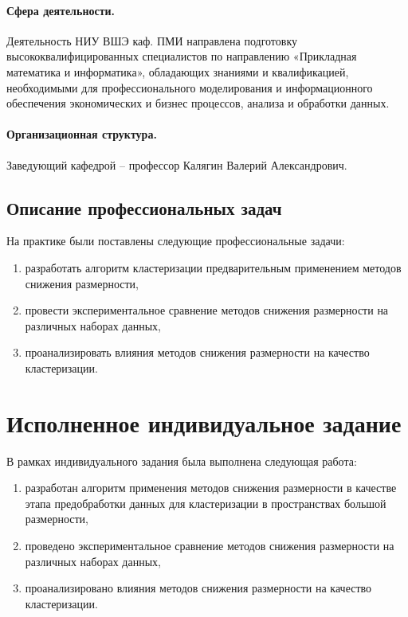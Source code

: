         \paragraph{Сфера деятельности.} Деятельность НИУ ВШЭ каф. ПМИ направлена подготовку высококвалифицированных специалистов по направлению «Прикладная математика и информатика», обладающих знаниями и квалификацией, необходимыми для профессионального моделирования и информационного обеспечения экономических и бизнес процессов, анализа и обработки данных.

        \paragraph{Организационная структура.} Заведующий кафедрой – профессор Калягин Валерий Александрович.


    \subsection{Описание профессиональных задач}
        На практике были поставлены следующие профессиональные задачи:
        \begin{enumerate}
        \item разработать алгоритм кластеризации предварительным применением методов снижения размерности,
        \item провести экспериментальное сравнение методов снижения размерности на различных наборах данных,
        \item проанализировать влияния методов снижения размерности на качество кластеризации.
        \end{enumerate}



\section{Исполненное индивидуальное задание}

    В рамках индивидуального задания была выполнена следующая работа:
    \begin{enumerate}
        \item разработан алгоритм применения методов снижения размерности в качестве этапа предобработки данных для кластеризации в пространствах большой размерности,
        \item проведено экспериментальное сравнение методов снижения размерности на различных наборах данных,
        \item проанализировано влияния методов снижения размерности на качество кластеризации.
    \end{enumerate}

